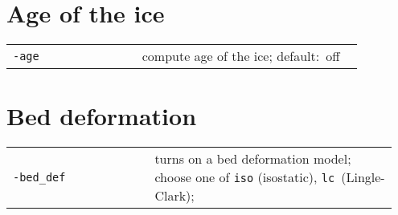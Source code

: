 \documentclass[landscape]{article}
\begin{document}
\begin{textblock}{15}
\section{Age of the ice}
\label{sec:age}
\begin{tabular}{@{}p{0.35\linewidth}p{0.6\linewidth}@{}}
\texttt{-age} & compute age of the ice; \mbox{default: off}\\
\end{tabular}

\section{Bed deformation}
\label{sec:bed-deformation}
\begin{tabular}{@{}p{0.35\linewidth}p{0.6\linewidth}@{}}
  \texttt{-bed_def} & turns on a bed deformation model; choose one of \texttt{iso} (isostatic), \texttt{lc}~(Lingle-Clark);\\
\end{tabular}



\end{textblock}
\end{document}
